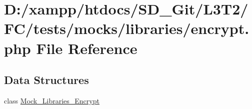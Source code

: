\hypertarget{tests_2mocks_2libraries_2_encrypt_8php}{}\section{D\+:/xampp/htdocs/\+S\+D\+\_\+\+Git/\+L3\+T2/\+F\+C/tests/mocks/libraries/encrypt.php File Reference}
\label{tests_2mocks_2libraries_2_encrypt_8php}
\subsection*{Data Structures}
\begin{DoxyCompactItemize}
\item 
class \hyperlink{class_mock___libraries___encrypt}{Mock\+\_\+\+Libraries\+\_\+\+Encrypt}
\end{DoxyCompactItemize}
